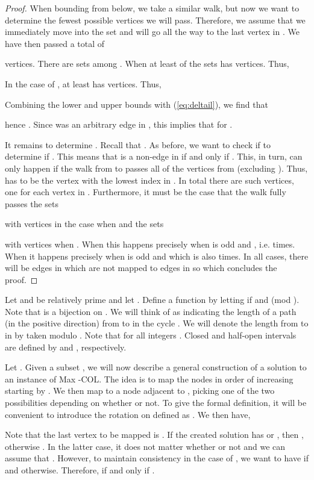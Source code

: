 \documentclass[11pt,a4paper]{article}
\begin{document}
\begin{proof}
When bounding  from below, we take a similar walk, but now we want to determine the fewest possible vertices we will pass. Therefore, we assume that we immediately move into the set  and will go all the way to the last vertex in . We have then passed a total of

vertices. There are  sets among .  When  at least  of the sets has  vertices. Thus,

In the case of , at least  has  vertices. Thus,

Combining the lower and upper bounds with (\ref{eq:deltail}), we find that

hence .
Since  was an arbitrary edge in , this implies that  for .

It remains to determine .
Recall that .
As before, we want to check if  to determine if .
This means that  is a non-edge in  
if and only if .
This, in turn, can only happen if the walk from  to  passes all  of the vertices from  (excluding ).
Thus,  has to be the vertex with the lowest index in .
In total there are  such vertices, one for each vertex in .
Furthermore, it must be the case that the walk fully passes the  sets

with  vertices in the case when  and the  sets

with  vertices when .
When  this happens precisely when  is odd and 
, i.e.  times.
When  it happens precisely when  is odd and 
 which is also  times.
In all cases, there will be  edges in  which are not mapped to edges in
 so  which concludes the proof.
\end{proof}

Let  and  be relatively prime and let . Define a function  by letting  if  and  (mod ). Note that  is a bijection on . We will think of  as indicating the length of a path (in the positive direction) from  to  in the cycle .
We will denote the length from  to  in  by  taken modulo . 
Note that  for all integers .
Closed and half-open intervals are defined by  and , respectively.


Let .
Given a subset , we will now describe a general construction
of a solution  to an instance  of {\sc Max -COL}.
The idea is to map the nodes  in order of increasing  starting by . We then map  to a node adjacent to , picking one of the two possibilities depending on whether  or not.
To give the formal definition, it will be convenient to introduce the rotation
 on  defined as .
We then have,

Note that the last vertex to be mapped is .
If the created solution has  or , then
, otherwise .
In the latter case, it does not matter whether  or not and we
can assume that .
However, to maintain consistency in the case of ,
we want to have  if  and
 otherwise.
Therefore,  if and only if .
\end{document}
